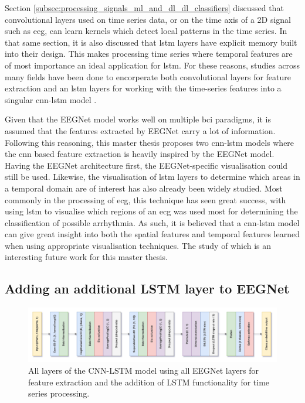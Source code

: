 Section \ref{subsec:processing_signals_ml_and_dl_dl_classifiers} discussed that convolutional layers used on time series data, or on the time axis of a 2D signal such as \gls{eeg}, can learn kernels which detect local patterns in the time series.
In that same section, it is also discussed that \gls{lstm} layers have explicit memory built into their design.
This makes processing time series where temporal features are of most importance an ideal application for \gls{lstm}.
For these reasons, studies across many fields have been done to encorperate both convolutional layers for feature extraction and an \gls{lstm} layers for working with the time-series features into a singular \gls{cnn}-\gls{lstm} model \citep{lstm_cnn_mi_eeg, cnn_bilstm_eeg_robot_arm}.

Given that the EEGNet model works well on multiple \gls{bci} paradigms, it is assumed that the features extracted by EEGNet carry a lot of information.
Following this reasoning, this master thesis proposes two \gls{cnn}-\gls{lstm} models where the \gls{cnn} based feature extraction is heavily inspired by the EEGNet model.
Having the EEGNet architecture first, the EEGNet-specific visualisation could still be used.
Likewise, the visualisation of \gls{lstm} layers to determine which areas in a temporal domain are of interest has also already been widely studied.
Most commonly in the processing of \gls{ecg}, this technique has seen great success, with \citet{lstm_visual_ecg} using \gls{lstm} to visualise which regions of an \gls{ecg} was used most for determining the classification of possible arrhythmia.
As such, it is believed that a \gls{cnn}-\gls{lstm} model can give great insight into both the spatial features and temporal features learned when using appropriate visualisation techniques.
The study of which is an interesting future work for this master thesis.


\subsection{Adding an additional LSTM layer to EEGNet}
\label{subsec:offline_bci_system_adding_memory_lstm_eegnet}


\begin{figure}[t]
    \centering
    \includegraphics[width=\linewidth]{../images/pipeline/eegnetlstm_full.pdf}
    \captionsetup{width=0.8\linewidth}
    \captionsetup{justification=centering}
    \caption{All layers of the CNN-LSTM model using all EEGNet layers for feature extraction and the addition of LSTM functionality for time series processing.}
    \label{fig:eegnetlstm_full}
\end{figure}

